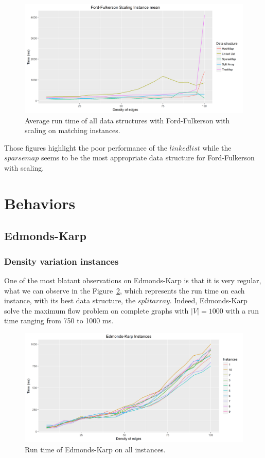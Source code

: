 \begin{figure}[H]
\begin{center}
\includegraphics[scale=0.5]{images/ffmeanmatching2.png}
\caption{Average run time of all data structures with Ford-Fulkerson with scaling on matching instances.}
\label{fig:ffmeanmatching}
\end{center}
\end{figure}
Those figures highlight the poor performance of the $linked list$ while the $sparsemap$ seems to be the most appropriate data structure for Ford-Fulkerson with scaling.
\section{Behaviors}
\subsection{Edmonds-Karp}
\subsubsection{Density variation instances}
One of the most blatant observations on Edmonds-Karp is that it is very regular, what we can observe in the Figure~\ref{fig:EKmean}, which represents the run time on each instance, with its best data structure, the $split array$. Indeed, Edmonds-Karp solve the maximum flow problem on complete graphs with $|V|=1000$ with a run time ranging from 750 to 1000 ms.
\begin{figure}[H]
\begin{center}
\includegraphics[scale=0.5]{images/EKmean.png}
\caption{Run time of Edmonds-Karp on all instances.}
\label{fig:EKmean}
\end{center}
\end{figure}
